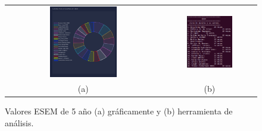 \documentclass[a4paper, 12pt]{book}
\begin{document}
\begin{figure}[!h]
    \centering
    \begin{tabular}{cc}
    \includegraphics[width=0.45\textwidth]{img/esem_5_years_graph.png} &  
    \includegraphics[width=0.52\textwidth]{img/esem_5_years.png} \\ 
    (a) &(b) 
    \end{tabular}
    \caption{Valores ESEM de 5 año (a) gráficamente y (b) herramienta de análisis.}
    \label{fig:comp_esem_5_year}
\end{figure}
\end{document}
